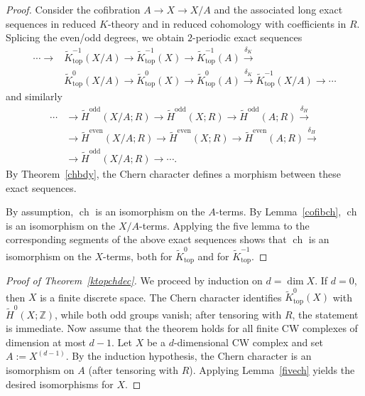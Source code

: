 \documentclass[11pt]{amsart}
\numberwithin{equation}{section}
\newcommand{\Z}{\mathbb{Z}}
\newcommand{\ch}{{\operatorname{ch}}}
\newcommand{\topp}{{\operatorname{top}}}
\numberwithin{equation}{section}
\begin{document}
\begin{proof}
Consider the cofibration $A\to X\to X/A$ and the associated long exact sequences in reduced $K$-theory and in reduced
cohomology with coefficients in $R$. Splicing the even/odd degrees, we obtain $2$-periodic exact sequences
\[
\begin{aligned}
\cdots\to {}&\widetilde{K}_{\topp}^{-1}(X/A)\to \widetilde{K}_{\topp}^{-1}(X)\to \widetilde{K}_{\topp}^{-1}(A)\xrightarrow{\delta_K}\\
&\widetilde{K}_{\topp}^{0}(X/A)\to \widetilde{K}_{\topp}^{0}(X)\to \widetilde{K}_{\topp}^{0}(A)\xrightarrow{\delta_K}\widetilde{K}_{\topp}^{-1}(X/A)\to\cdots
\end{aligned}
\]
and similarly
\begin{align*}
\cdots &\to \widetilde H^{\mathrm{odd}}(X/A;R)\to \widetilde H^{\mathrm{odd}}(X;R)\to \widetilde H^{\mathrm{odd}}(A;R)\xrightarrow{\delta_H}\\
&\to \widetilde H^{\mathrm{even}}(X/A;R)\to \widetilde H^{\mathrm{even}}(X;R)\to \widetilde H^{\mathrm{even}}(A;R)\xrightarrow{\delta_H}\\
&\to \widetilde H^{\mathrm{odd}}(X/A;R)\to\cdots .
\end{align*}
By Theorem~\ref{chbdy}, the Chern character defines a morphism between these exact sequences.

By assumption, $\ch$ is an isomorphism on the $A$-terms.
By Lemma~\ref{cofibch}, $\ch$ is an isomorphism on the $X/A$-terms.
Applying the five lemma to the corresponding segments of the above exact sequences shows that $\ch$ is an isomorphism
on the $X$-terms, both for $\widetilde{K}_{\topp}^{0}$ and for $\widetilde{K}_{\topp}^{-1}$.
\end{proof}

\begin{proof}[Proof of Theorem~\ref{ktopchdec}]
We proceed by induction on $d=\dim X$. If $d=0$, then $X$ is a finite discrete space. The Chern character identifies $\widetilde{K}_{\topp}^0(X)$ with $\widetilde H^0(X;\Z)$, while both odd groups vanish; after tensoring with $R$, the statement is immediate. Now assume that the theorem holds for all finite CW complexes of dimension at most $d-1$.
Let $X$ be a $d$-dimensional CW complex and set $A:=X^{(d-1)}$.
By the induction hypothesis, the Chern character is an isomorphism on $A$ (after tensoring with $R$).
Applying Lemma~\ref{fivech} yields the desired isomorphisms for $X$.
\end{proof}
\end{document}
